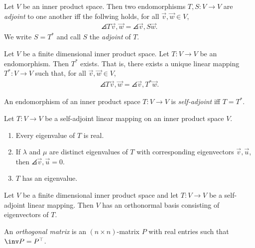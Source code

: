 \documentclass{article}
\begin{document}
\begin{definition}
	Let $V$ be an inner product space. Then two endomorphisms $T,S:V\to V$ are \emph{adjoint}
	to one another iff the follwing holds, for all $\vec v, \vec w\in V$,
	\begin{align*}
		\angles{T\vec v,\vec w}=\angles{\vec v, S\vec w}.
	\end{align*}
	We write $S=T^*$ and call $S$ the \emph{adjoint} of $T$.
\end{definition}

\begin{theorem}[Theorem 5.3.4]
	Let $V$ be a finite dimensional inner product space. Let $T:V\to V$ be an endomorphism. Then $T^*$
	exists. That is, there exists a unique linear mapping $T^*:V\to V$ such that, for all $\vec v,\vec w\in V$,
	\begin{align*}
		\angles{T\vec v,\vec w}=\angles{\vec v, T^*\vec w}.
	\end{align*}
\end{theorem}

\begin{definition}
	An endomorphism of an inner product space $T:V\to V$ is \emph{self-adjoint} iff $T=T^*$.
\end{definition}

\begin{theorem}[Theorem 5.3.7]
	Let $T:V\to V$ be a self-adjoint linear mapping on an inner product space $V$.
	\begin{enumerate}
		\item Every eigenvalue of $T$ is real.
		\item If $\lambda$ and $\mu$ are distinct eigenvalues of $T$ with corresponding eigenvectors
		      $\vec v,\vec u$, then $\angles{\vec v,\vec u}=0$.
		\item $T$ has an eigenvalue.
	\end{enumerate}
\end{theorem}

\begin{theorem}
	Let $V$ be a finite dimensional inner product space and let $T:V\to V$ be a self-adjoint linear
	mapping. Then $V$ has an orthonormal basis consisting of eigenvectors of $T$.
\end{theorem}

\begin{definition}
	An \emph{orthogonal matrix} is an $(n\times n)$-matrix $P$ with real entries such that $\inv P=P^\top$.
\end{definition}
\end{document}
